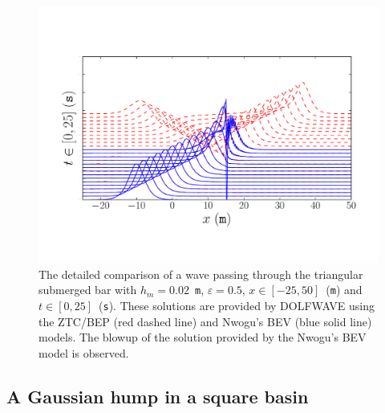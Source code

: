 \begin{figure}
  \centering
  \includegraphics[width=\largefig]{chapters/lopes/pdf/epsilon0_5.pdf}
  \caption{The detailed comparison of a wave passing through the
    triangular submerged bar with $h_m=0.02$~{\tt m}, $\varepsilon=0.5$,
    $x\in[-25,50]$~({\tt m}) and $t\in[0,25]$~({\tt s}).  These solutions
    are provided by DOLFWAVE using the ZTC/BEP (red dashed line) and
    Nwogu's BEV (blue solid line) models.  The blowup of the solution
    provided by the Nwogu's BEV model is observed.}
  \label{fig:lopes:zn05}
\end{figure}

\subsection{A Gaussian hump in a square basin}

